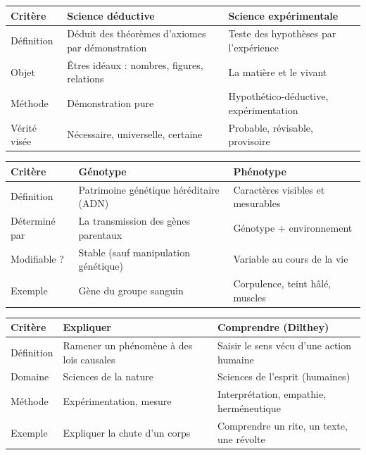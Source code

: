 \documentclass[11pt]{article}
\begin{document}
\begin{corrige}
\begin{center}
\begin{tabularx}{\linewidth}{|l|X|X|}
\hline
\rowcolor{popblueL} \textbf{Critère} & \textbf{Science déductive} & \textbf{Science expérimentale} \\
\hline
Définition & Déduit des théorèmes d'axiomes par démonstration & Teste des hypothèses par l'expérience \\
\hline
Objet & Êtres idéaux : nombres, figures, relations & La matière et le vivant \\
\hline
Méthode & Démonstration pure & Hypothético-déductive, expérimentation \\
\hline
Vérité visée & Nécessaire, universelle, certaine & Probable, révisable, provisoire \\
\hline
\end{tabularx}
\end{center}

\begin{center}
\begin{tabularx}{\linewidth}{|l|X|X|}
\hline
\rowcolor{popblueL} \textbf{Critère} & \textbf{Génotype} & \textbf{Phénotype} \\
\hline
Définition & Patrimoine génétique héréditaire (ADN) & Caractères visibles et mesurables \\
\hline
Déterminé par & La transmission des gènes parentaux & Génotype + environnement \\
\hline
Modifiable ? & Stable (sauf manipulation génétique) & Variable au cours de la vie \\
\hline
Exemple & Gène du groupe sanguin & Corpulence, teint hâlé, muscles \\
\hline
\end{tabularx}
\end{center}

\begin{center}
\begin{tabularx}{\linewidth}{|l|X|X|}
\hline
\rowcolor{popblueL} \textbf{Critère} & \textbf{Expliquer} & \textbf{Comprendre (Dilthey)} \\
\hline
Définition & Ramener un phénomène à des lois causales & Saisir le sens vécu d'une action humaine \\
\hline
Domaine & Sciences de la nature & Sciences de l'esprit (humaines) \\
\hline
Méthode & Expérimentation, mesure & Interprétation, empathie, herméneutique \\
\hline
Exemple & Expliquer la chute d'un corps & Comprendre un rite, un texte, une révolte \\
\hline
\end{tabularx}
\end{center}


\end{corrige}
\end{document}
